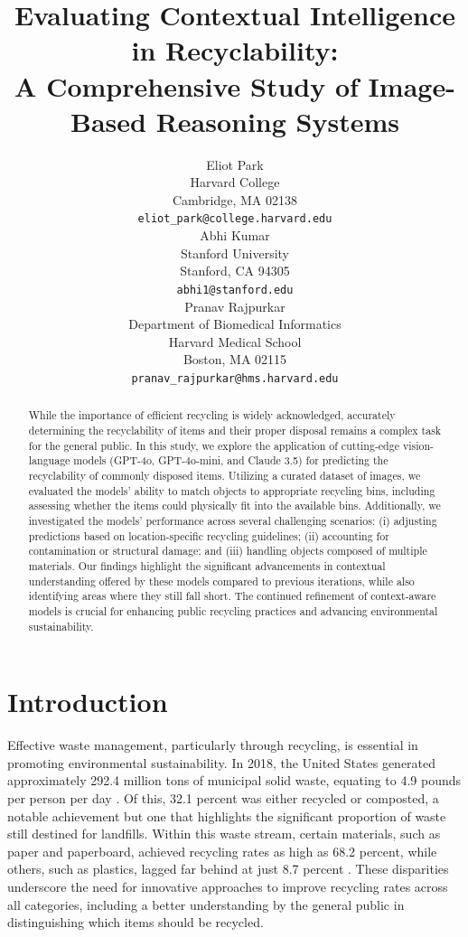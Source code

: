 \documentclass{article}
\title{Evaluating Contextual Intelligence in Recyclability: \\ A Comprehensive Study of Image-Based Reasoning Systems}
\author{
  Eliot Park \\
  Harvard College\\
  Cambridge, MA 02138 \\
  \texttt{eliot\_park@college.harvard.edu} \\
  \And
  Abhi Kumar \\
  Stanford University \\
  Stanford, CA 94305 \\
  \texttt{abhi1@stanford.edu} \\
  \And
  Pranav Rajpurkar \\
  Department of Biomedical Informatics\\
  Harvard Medical School\\
  Boston, MA 02115 \\
  \texttt{pranav\_rajpurkar@hms.harvard.edu} \\
}
\begin{document}
\maketitle
\begin{abstract}
While the importance of efficient recycling is widely acknowledged, accurately determining the recyclability of items and their proper disposal remains a complex task for the general public. In this study, we explore the application of cutting-edge vision-language models (GPT-4o, GPT-4o-mini, and Claude 3.5) for predicting the recyclability of commonly disposed items. Utilizing a curated dataset of images, we evaluated the models’ ability to match objects to appropriate recycling bins, including assessing whether the items could physically fit into the available bins. Additionally, we investigated the models’ performance across several challenging scenarios: (i) adjusting predictions based on location-specific recycling guidelines; (ii) accounting for contamination or structural damage; and (iii) handling objects composed of multiple materials. Our findings highlight the significant advancements in contextual understanding offered by these models compared to previous iterations, while also identifying areas where they still fall short. The continued refinement of context-aware models is crucial for enhancing public recycling practices and advancing environmental sustainability.
\end{abstract}


\section{Introduction}

Effective waste management, particularly through recycling, is essential in promoting environmental sustainability. In 2018, the United States generated approximately 292.4 million tons of municipal solid waste, equating to 4.9 pounds per person per day \citep{epa-website}. Of this, 32.1 percent was either recycled or composted, a notable achievement but one that highlights the significant proportion of waste still destined for landfills. Within this waste stream, certain materials, such as paper and paperboard, achieved recycling rates as high as 68.2 percent, while others, such as plastics, lagged far behind at just 8.7 percent \citep{epa-website}. These disparities underscore the need for innovative approaches to improve recycling rates across all categories, including a better understanding by the general public in distinguishing which items should be recycled.
\end{document}
